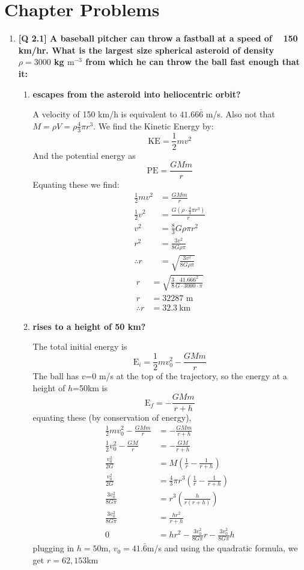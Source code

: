 \documentclass[11pt]{article}
\begin{document}
	\section{Chapter Problems}
	\begin{enumerate}
		\item  \textbf{[Q 2.1] A baseball pitcher can throw a fastball at a speed of ~ 150 km/hr. What is the largest size spherical asteroid of density $\rho = 3000$ kg $\text{m}^{-3}$ from which he can throw the ball fast enough that it:} 
		\begin{enumerate}
			\item  \textbf{escapes from the asteroid into heliocentric orbit?}
			
			A velocity of 150 km/h is equivalent to $41.66\bar{6}$ m/s. Also not that $M = \rho V = \rho \frac{4}{3} \pi r^3$. We find the Kinetic Energy by:
			\[ \text{KE} = \frac{1}{2} mv^2 \]
			And the potential energy as 
			\[ \text{PE} = \frac{GMm}{r} \]
			Equating these we find:
			\begin{align*}
				\frac{1}{2} mv^2 &= \frac{GMm}{r} \\
				\frac{1}{2} v^2 &= \frac{G \left( \rho \cdot \frac{4}{3} \pi r^3 \right)}{r} \\
				v^2 &=  \frac{8}{3} G \rho \pi r^2 \\
				r^2 &= \frac{3 v^2}{8 G \rho \pi} \\
				\therefore r &= \sqrt{\frac{3 v^2}{8 G \rho \pi}} 
			\end{align*}
			\begin{align*}
				r &= \sqrt{\frac{3}{8}\frac{41.666^2}{G \cdot 3000 \cdot \pi}} \\
				r &= 32 287 \text{ m} \\
				\therefore r &= 32.3 \ \text{km}
			\end{align*}
			\item  \textbf{rises to a height of 50 km?}

			The total initial energy is
			\[ \text{E}_i = \frac{1}{2}mv_0^2 - \frac{GMm}{r} \]
			The ball has $v$=0 m/s at the top of the trajectory, so the energy at a height of $h$=50km is
			\[ \text{E}_f = -\frac{GMm}{r + h} \]
			equating these (by conservation of energy),
			\begin{align*}
			    \frac{1}{2}mv_0^2 - \frac{GMm}{r} &= -\frac{GMm}{r+h}  \\
			    \frac{1}{2}v_0^2 - \frac{GM}{r} &= -\frac{GM}{r+h} \\
			    \frac{v_0^2}{2G} &= M\left(\frac{1}{r} - \frac{1}{r+h}\right) \\
			    \frac{v_0^2}{2G} &= \frac{4}{3}\pi r^3 \left(\frac{1}{r} - \frac{1}{r+h}\right)\\
			    \frac{3v_0^2}{8G\pi} &= r^3 \left(\frac{h}{r(r+h)}\right) \\
			    \frac{3v_0^2}{8G\pi} &= \frac{hr^2}{r+h} \\
			    0 &= hr^2 - \frac{3v_0^2}{8G\pi} r - \frac{3v_0^2}{8G\pi}h
			\end{align*}
			plugging in $h=50$m, $v_0 = 41.\bar{6}$m/s and using the quadratic formula, we get $r = 62,153$km
			

\end{enumerate}
\end{enumerate}
\end{document}

